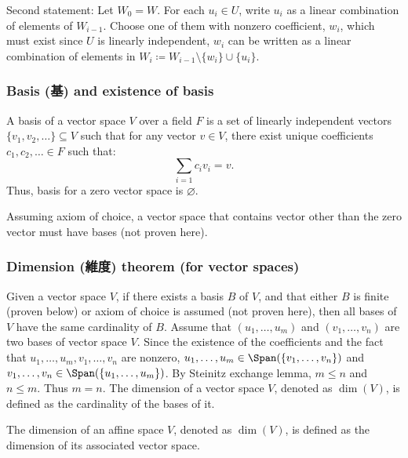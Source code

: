 \documentclass[a4paper,12pt]{report}
\begin{document}
Second statement: Let $W_0=W$. For each $u_i\in U$, write $u_i$ as a linear combination of elements of $W_{i-1}$. Choose one of them with nonzero coefficient, $w_i$, which must exist since $U$ is linearly independent, $w_i$ can be written as a linear combination of elements in $W_i\coloneq W_{i-1}\setminus\{w_i\}\cup\{u_i\}$.
\epr
\subsubsection{Basis (基) and existence of basis}
A basis of a vector space $V$ over a field $F$ is a set of linearly independent vectors $\{v_1,v_2,\ldots\}\subseteq V$ such that for any vector $v\in V$, there exist unique coefficients $c_1,c_2,\ldots\in F$ such that:
\[\sum_{i=1}c_iv_i=v.\]
Thus, basis for a zero vector space is $\varnothing$.

Assuming axiom of choice, a vector space that contains vector other than the zero vector must have bases (not proven here).
\subsubsection{Dimension (維度) theorem (for vector spaces)}
Given a vector space $V$, if there exists a basis $B$ of $V$, and that either $B$ is finite (proven below) or axiom of choice is assumed (not proven here), then all bases of $V$ have the same cardinality of $B$.
\bpr
Assume that $(u_1,\ldots,u_m)$ and $(v_1,\ldots,v_n)$ are two bases of vector space $V$. Since the existence of the coefficients and the fact that $u_1,\ldots,u_m,v_1,\ldots,v_n$ are nonzero, $u_1,\ldots,u_m\in\Span(\{v_1,\ldots,v_n\})$ and $v_1,\ldots,v_n\in\Span(\{u_1,\ldots,u_m\})$. By Steinitz exchange lemma, $m\le n$ and $n\le m$. Thus $m=n$.
\epr
{}
The dimension of a vector space $V$, denoted as $\dim(V)$, is defined as the cardinality of the bases of it.

The dimension of an affine space $V$, denoted as $\dim(V)$, is defined as the dimension of its associated vector space.
\end{document}
